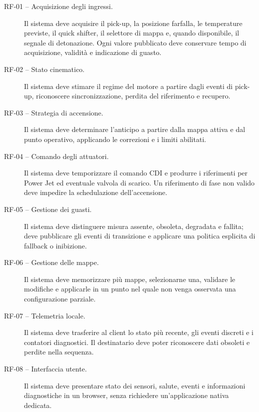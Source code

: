 \documentclass{article}
\begin{document}
\begin{description}
    \item[RF-01 -- Acquisizione degli ingressi.] Il sistema deve acquisire il
          pick-up, la posizione farfalla, le temperature previste, il quick
          shifter, il selettore di mappa e, quando disponibile, il segnale di
          detonazione. Ogni valore pubblicato deve conservare tempo di
          acquisizione, validità e indicazione di guasto.

    \item[RF-02 -- Stato cinematico.] Il sistema deve stimare il regime del
          motore a partire dagli eventi di pick-up, riconoscere
          sincronizzazione, perdita del riferimento e recupero.

    \item[RF-03 -- Strategia di accensione.] Il sistema deve determinare
          l'anticipo a partire dalla mappa attiva e dal punto operativo,
          applicando le correzioni e i limiti abilitati.

    \item[RF-04 -- Comando degli attuatori.] Il sistema deve temporizzare il
          comando CDI e produrre i riferimenti per Power Jet ed eventuale
          valvola di scarico. Un riferimento di fase non valido deve impedire
          la schedulazione dell'accensione.

    \item[RF-05 -- Gestione dei guasti.] Il sistema deve distinguere misura
          assente, obsoleta, degradata e fallita; deve pubblicare gli eventi di
          transizione e applicare una politica esplicita di fallback o
          inibizione.

    \item[RF-06 -- Gestione delle mappe.] Il sistema deve memorizzare più mappe,
          selezionarne una, validare le modifiche e applicarle in un punto nel
          quale non venga osservata una configurazione parziale.

    \item[RF-07 -- Telemetria locale.] Il sistema deve trasferire al client lo
          stato più recente, gli eventi discreti e i contatori diagnostici. Il
          destinatario deve poter riconoscere dati obsoleti e perdite nella
          sequenza.

    \item[RF-08 -- Interfaccia utente.] Il sistema deve presentare stato dei
          sensori, salute, eventi e informazioni diagnostiche in un browser,
          senza richiedere un'applicazione nativa dedicata.


\end{description}
\end{document}
